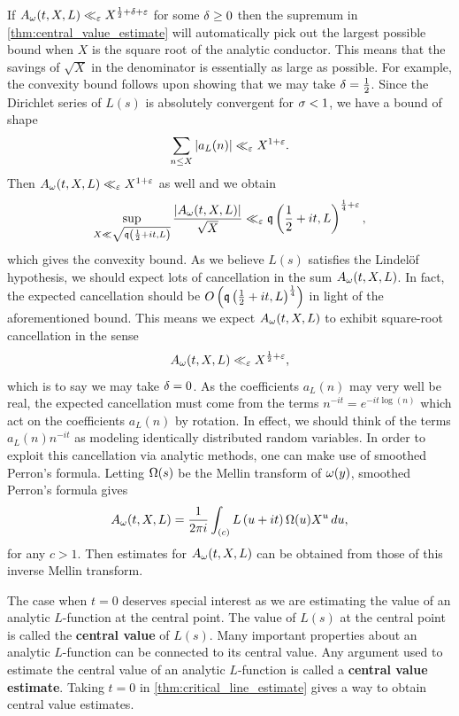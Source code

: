     If \(A_{\omega}(t,X,L) \ll_{\varepsilon} X^{\frac{1}{2}+\delta+\varepsilon}\) for some \(\delta \ge 0\) then the supremum in \cref{thm:central_value_estimate} will automatically pick out the largest possible bound when \(X\) is the square root of the analytic conductor. This means that the savings of \(\sqrt{X}\) in the denominator is essentially as large as possible. For example, the convexity bound follows upon showing that we may take \(\delta = \frac{1}{2}\). Since the Dirichlet series of \(L(s)\) is absolutely convergent for \(\sigma < 1\), we have a bound of shape
    \[
      \sum_{n \le X}|a_{L}(n)| \ll_{\varepsilon} X^{1+\varepsilon}.
    \]
    Then \(A_{\omega}(t,X,L) \ll_{\varepsilon} X^{1+\varepsilon}\) as well and we obtain
    \begin{equation}\label{equ:coefficient_sum_trivial_bound}
      \sup_{X \ll \sqrt{\mathfrak{q}\left(\frac{1}{2}+it,L\right)}}\frac{|A_{\omega}(t,X,L)|}{\sqrt{X}} \ll_{\varepsilon} \mathfrak{q}\left(\frac{1}{2}+it,L\right)^{\frac{1}{4}+\varepsilon},
    \end{equation}
    which gives the convexity bound. As we believe \(L(s)\) satisfies the Lindel\"of hypothesis, we should expect lots of cancellation in the sum \(A_{\omega}(t,X,L)\). In fact, the expected cancellation should be \(O\left(\mathfrak{q}\left(\frac{1}{2}+it,L\right)^{\frac{1}{4}}\right)\) in light of the aforementioned bound. This means we expect \(A_{\omega}(t,X,L)\) to exhibit square-root cancellation in the sense
    \[
      A_{\omega}(t,X,L) \ll_{\varepsilon} X^{\frac{1}{2}+\varepsilon},
    \]
    which is to say we may take \(\delta = 0\). As the coefficients \(a_{L}(n)\) may very well be real, the expected cancellation must come from the terms \(n^{-it} = e^{-it\log(n)}\) which act on the coefficients \(a_{L}(n)\) by rotation. In effect, we should think of the terms \(a_{L}(n)n^{-it}\) as modeling identically distributed random variables. In order to exploit this cancellation via analytic methods, one can make use of smoothed Perron's formula. Letting \(\Omega(s)\) be the Mellin transform of \(\omega(y)\), smoothed Perron's formula gives
    \[
      A_{\omega}(t,X,L) = \frac{1}{2\pi i}\int_{(c)}L\left(u+it\right)\Omega(u)X^{u}\,du,
    \]
    for any \(c > 1\). Then estimates for \(A_{\omega}(t,X,L)\) can be obtained from those of this inverse Mellin transform.

    The case when \(t = 0\) deserves special interest as we are estimating the value of an analytic \(L\)-function at the central point. The value of \(L(s)\) at the central point is called the \textbf{central value} of \(L(s)\). Many important properties about an analytic \(L\)-function can be connected to its central value. Any argument used to estimate the central value of an analytic \(L\)-function is called a \textbf{central value estimate}. Taking \(t = 0\) in \cref{thm:critical_line_estimate} gives a way to obtain central value estimates.

